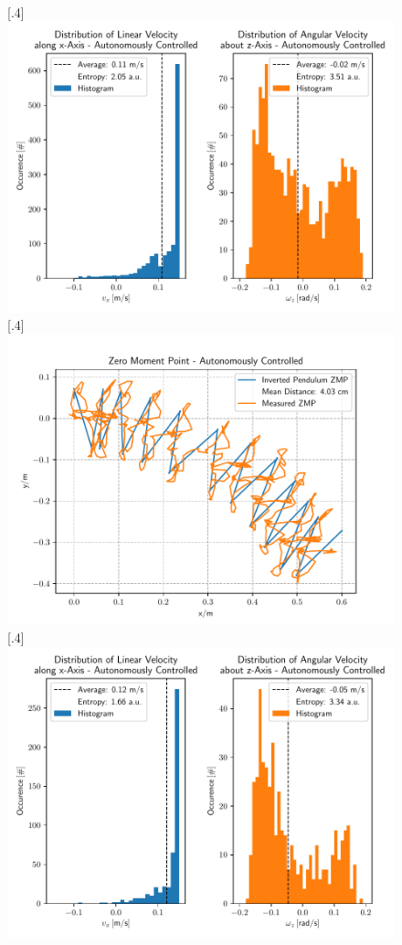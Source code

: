 \begin{figure}[h]
	[.4\linewidth]{\includegraphics[scale=.35]{chapters/05_experiments/04_autonomous_walking/curved_walk_01_entropy.pdf}}
	[.4\linewidth]{\includegraphics[scale=.35]{chapters/05_experiments/04_autonomous_walking/obstacle_walk_02_zmp.pdf}}
	[.4\linewidth]{\includegraphics[scale=.35]{chapters/05_experiments/04_autonomous_walking/obstacle_walk_02_entropy.pdf}}

\end{figure}
